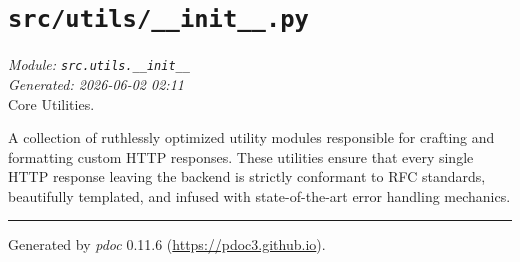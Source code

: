 
\section{\texttt{src/utils/\_\_init\_\_.py}}
\textit{Module: \texttt{src.utils.\_\_init\_\_}} \\
\textit{Generated: 2026-06-02 02:11} \\

Core Utilities.

A collection of ruthlessly optimized utility modules responsible for
crafting and formatting custom HTTP responses. These utilities ensure
that every single HTTP response leaving the backend is strictly
conformant to RFC standards, beautifully templated, and infused with
state-of-the-art error handling mechanics.

\begin{center}\rule{0.5\linewidth}{0.5pt}
\end{center}

Generated by \emph{pdoc} 0.11.6 (\url{https://pdoc3.github.io}).
